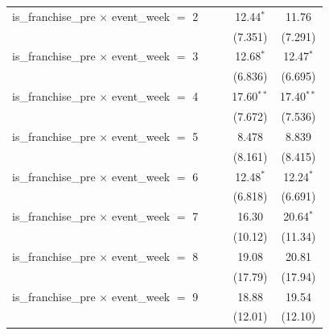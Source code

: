 \begin{tabular}{lcccc}
   is\_franchise\_pre $\times$ event\_week $=$ 2           &                &               & 12.44$^{*}$  & 11.76\\   
                                                           &                &               & (7.351)      & (7.291)\\   
   is\_franchise\_pre $\times$ event\_week $=$ 3           &                &               & 12.68$^{*}$  & 12.47$^{*}$\\   
                                                           &                &               & (6.836)      & (6.695)\\   
   is\_franchise\_pre $\times$ event\_week $=$ 4           &                &               & 17.60$^{**}$ & 17.40$^{**}$\\   
                                                           &                &               & (7.672)      & (7.536)\\   
   is\_franchise\_pre $\times$ event\_week $=$ 5           &                &               & 8.478        & 8.839\\   
                                                           &                &               & (8.161)      & (8.415)\\   
   is\_franchise\_pre $\times$ event\_week $=$ 6           &                &               & 12.48$^{*}$  & 12.24$^{*}$\\   
                                                           &                &               & (6.818)      & (6.691)\\   
   is\_franchise\_pre $\times$ event\_week $=$ 7           &                &               & 16.30        & 20.64$^{*}$\\   
                                                           &                &               & (10.12)      & (11.34)\\   
   is\_franchise\_pre $\times$ event\_week $=$ 8           &                &               & 19.08        & 20.81\\   
                                                           &                &               & (17.79)      & (17.94)\\   
   is\_franchise\_pre $\times$ event\_week $=$ 9           &                &               & 18.88        & 19.54\\   
                                                           &                &               & (12.01)      & (12.10)\\   

\end{tabular}
